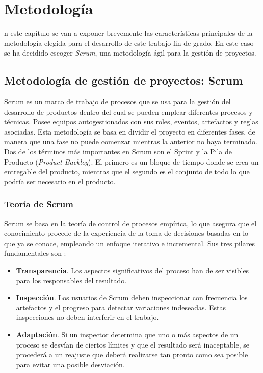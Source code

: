 \chapter{Metodología}
\label{chap:metodologia}

n este capítulo se van a exponer brevemente las características principales de la metodología elegida para el desarrollo de este trabajo fin de grado. En este caso se ha decidido escoger \textit{Scrum}, una metodología ágil para la gestión de proyectos.

\section{Metodología de gestión de proyectos: Scrum}
Scrum \cite{Schwaber2017} es un marco de trabajo de procesos que se usa para la gestión del desarrollo de productos dentro del cual se pueden emplear diferentes procesos y técnicas. Posee equipos autogestionados con sus roles, eventos, artefactos y reglas asociadas. Esta metodología se basa en dividir el proyecto en diferentes fases, de manera que una fase no puede comenzar mientras la anterior no haya terminado. Dos de los términos más importantes en Scrum son el Sprint y la Pila de Producto (\textit{Product Backlog}). El primero es un bloque de tiempo donde se crea un entregable del producto, mientras que el segundo es el conjunto de todo lo que podría ser necesario en el producto.

\subsection{Teoría de Scrum}
Scrum se basa en la teoría de control de procesos empírica, lo que asegura que el conocimiento procede de la experiencia de la toma de decisiones basadas en lo que ya se conoce, empleando un enfoque iterativo e incremental. Sus tres pilares fundamentales son \cite{Schwaber2017}:

\begin{itemize}
	\item \textbf{Transparencia}. Los aspectos significativos del proceso han de ser visibles para los responsables del resultado.
	\item \textbf{Inspección}. Los usuarios de Scrum deben inspeccionar con frecuencia los artefactos y el progreso para detectar variaciones indeseadas. Estas inspecciones no deben interferir en el trabajo.
	\item \textbf{Adaptación}. Si un inspector determina que uno o más aspectos de un proceso se desvían de ciertos límites y que el resultado será inaceptable, se procederá a un reajuste que deberá realizarse tan pronto como sea posible para evitar una posible desviación.
\end{itemize}

